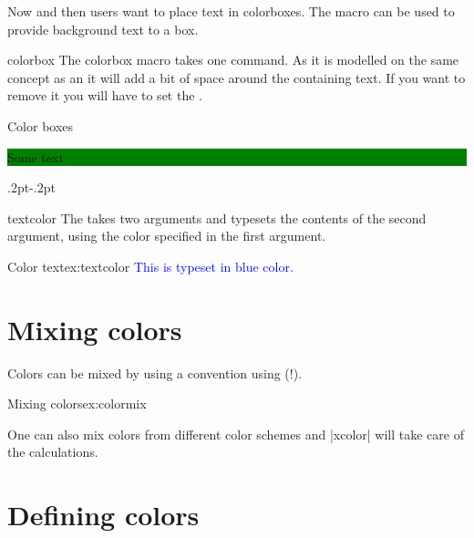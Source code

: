 Now and then users want to place text in colorboxes. The macro  can be used to provide background text to a box.

\begin{docCommand}{colorbox}{}
The colorbox macro takes one command. As it is modelled on the same concept as an
 it will add a bit of space around the containing text. If you want
to remove it you will have to set the .
\end{docCommand}


\begin{texexample}{Color boxes}{}
\colorbox{green}{\begin{minipage}{3cm}
  Some text
\end{minipage}}

\fboxrule.2pt\fboxsep-.2pt
\end{texexample}

\begin{docCommand}{textcolor}{}{}
The  takes two arguments and typesets the contents of the second argument, using the color specified in the first argument.
\end{docCommand}

\begin{texexample}{Color text}{ex:textcolor}
\textcolor{blue}{This is typeset in blue color.}

\end{texexample}

\section{Mixing colors}

Colors can be mixed by using a convention using (!).

\begin{texexample}{Mixing colors}{ex:colormix}
\color{blue!40!yellow}
\lorem 
\end{texexample}

One can also mix colors from different color schemes and |xcolor| will take care of the calculations.

\section{Defining colors}

